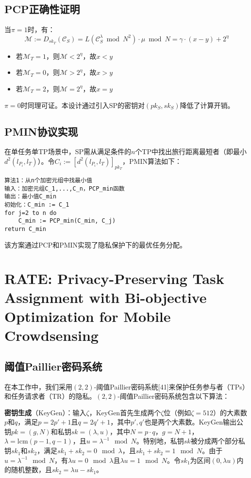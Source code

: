 \subsection{PCP正确性证明}
当\(\pi=1\)时，有：
\[
\mathcal{M}:=D_{sk_{T}}(\mathcal{C}_{S})=L(\mathcal{C}_{S}^{\lambda}\bmod N^{2})\cdot\mu\bmod N=\gamma\cdot(x-y)+2^{\eta}
\]
\begin{itemize}
    \item 若\(\mathcal{M}_{T}=1\)，则\(\mathcal{M}<2^{\eta}\)，故\(x<y\)
    \item 若\(\mathcal{M}_{T}=0\)，则\(\mathcal{M}>2^{\eta}\)，故\(x>y\)
    \item 若\(\mathcal{M}_{T}=2\)，则\(\mathcal{M}=2^{\eta}\)，故\(x=y\)
\end{itemize}
\(\pi=0\)时同理可证。本设计通过引入SP的密钥对\((pk_{S},sk_{S})\)降低了计算开销。

\subsection{PMIN协议实现}
在单任务单TP场景中，SP需从满足条件的\(n\)个TP中找出旅行距离最短者（即最小\(d^2(l_{P_i}, l_T)\)）。令\(C_i:=[d^2(l_{P_i}, l_T)]_{pk_T}\)，PMIN算法如下：

\begin{verbatim}
算法1：从n个加密元组中找最小值
输入：加密元组C_1,...,C_n，PCP_min函数
输出：最小值C_min
初始化：C_min := C_1
for j=2 to n do
    C_min := PCP_min(C_min, C_j)
return C_min
\end{verbatim}

该方案通过PCP和PMIN实现了隐私保护下的最优任务分配。

\clearpage

\section{RATE: Privacy-Preserving Task Assignment with  Bi-objective Optimization for Mobile Crowdsensing}

\subsection{阈值Paillier密码系统}

在本工作中，我们采用\((2,2)\)-阈值Paillier密码系统[41]来保护任务参与者（TPs）和任务请求者（TR）的隐私。\((2,2)\)-阈值Paillier密码系统包含以下算法：

\textbf{密钥生成}（KeyGen）：输入\(\zeta\)，KeyGen首先生成两个\(\zeta\)位（例如\(\zeta = 512\)）的大素数\(p\)和\(q\)，满足\(p = 2p' + 1\)且\(q = 2q' + 1\)，其中\(p', q'\)也是两个大素数。KeyGen输出公钥\(pk = (g, N)\)和私钥\(sk = (\lambda, u)\)，其中\(N = p \cdot q\)，\(g = N + 1\)，\(\lambda = \text{lcm}(p - 1, q - 1)\)，且\(u = \lambda^{-1} \mod N\)。特别地，私钥\(sk\)被分成两个部分私钥\(sk_1\)和\(sk_2\)，满足\(sk_1 + sk_2 = 0 \mod \lambda\)，且\(sk_1 + sk_2 = 1 \mod N\)。由于\(u = \lambda^{-1} \mod N\)，有\(\lambda u = 0 \mod \lambda\)且\(\lambda u = 1 \mod N\)。令\(sk_1\)为区间\((0, \lambda u)\)内的随机整数，且\(sk_2 = \lambda u - sk_1\)。

